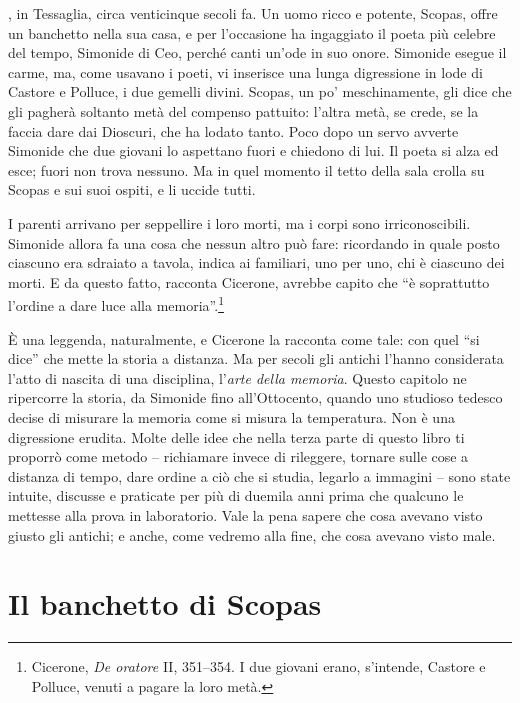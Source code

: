 , in Tessaglia, circa venticinque secoli fa. Un uomo ricco e potente, Scopas, offre un banchetto nella sua
casa, e per l'occasione ha ingaggiato il poeta più celebre del tempo,
Simonide di Ceo, perché canti un'ode in suo onore. Simonide esegue il
carme, ma, come usavano i poeti, vi inserisce una lunga digressione in
lode di Castore e Polluce, i due gemelli divini. Scopas, un po'
meschinamente, gli dice che gli pagherà soltanto metà del compenso
pattuito: l'altra metà, se crede, se la faccia dare dai Dioscuri, che
ha lodato tanto. Poco dopo un servo avverte Simonide che due giovani lo
aspettano fuori e chiedono di lui. Il poeta si alza ed esce; fuori non
trova nessuno. Ma in quel momento il tetto della sala crolla su Scopas e
sui suoi ospiti, e li uccide tutti.

I parenti arrivano per seppellire i loro morti, ma i corpi sono
irriconoscibili. Simonide allora fa una cosa che nessun altro può fare:
ricordando in quale posto ciascuno era sdraiato a tavola, indica ai
familiari, uno per uno, chi è ciascuno dei morti. E da questo fatto,
racconta Cicerone, avrebbe capito che \enquote{è soprattutto l'ordine a
dare luce alla memoria}.\footnote{Cicerone, \emph{De oratore} II,
351--354. I due giovani erano, s'intende, Castore e Polluce, venuti a
pagare la loro metà.}

È una leggenda, naturalmente, e Cicerone la racconta come tale: con
quel \enquote{si dice} che mette la storia a distanza. Ma per secoli
gli antichi l'hanno considerata l'atto di nascita di una disciplina,
l'\emph{arte della memoria}. Questo capitolo ne ripercorre la storia,
da Simonide fino all'Ottocento, quando uno studioso tedesco decise di
misurare la memoria come si misura la temperatura. Non è una
digressione erudita. Molte delle idee che nella terza parte di questo
libro ti proporrò come metodo -- richiamare invece di rileggere,
tornare sulle cose a distanza di tempo, dare ordine a ciò che si
studia, legarlo a immagini -- sono state intuite, discusse e praticate
per più di duemila anni prima che qualcuno le mettesse alla prova in
laboratorio. Vale la pena sapere che cosa avevano visto giusto gli
antichi; e anche, come vedremo alla fine, che cosa avevano visto male.

\section{Il banchetto di Scopas}


